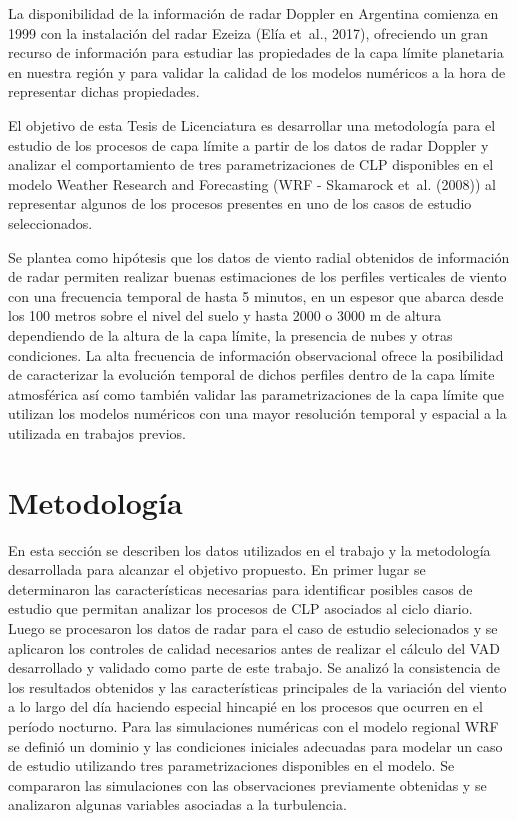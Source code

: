 \documentclass[12pt,spanish,oneside, a4paper]{book}
\begin{document}
La disponibilidad de la información de radar Doppler en Argentina
comienza en 1999 con la instalación del radar Ezeiza (Elía et~al.,
2017), ofreciendo un gran recurso de información para estudiar las
propiedades de la capa límite planetaria en nuestra región y para
validar la calidad de los modelos numéricos a la hora de representar
dichas propiedades.

El objetivo de esta Tesis de Licenciatura es desarrollar una metodología
para el estudio de los procesos de capa límite a partir de los datos de
radar Doppler y analizar el comportamiento de tres parametrizaciones de
CLP disponibles en el modelo Weather Research and Forecasting (WRF -
Skamarock et~al. (2008)) al representar algunos de los procesos
presentes en uno de los casos de estudio seleccionados.

Se plantea como hipótesis que los datos de viento radial obtenidos de
información de radar permiten realizar buenas estimaciones de los
perfiles verticales de viento con una frecuencia temporal de hasta 5
minutos, en un espesor que abarca desde los 100 metros sobre el nivel
del suelo y hasta 2000 o 3000 m de altura dependiendo de la altura de la
capa límite, la presencia de nubes y otras condiciones. La alta
frecuencia de información observacional ofrece la posibilidad de
caracterizar la evolución temporal de dichos perfiles dentro de la capa
límite atmosférica así como también validar las parametrizaciones de la
capa límite que utilizan los modelos numéricos con una mayor resolución
temporal y espacial a la utilizada en trabajos previos.

\chapter{Metodología}\label{metodologia}

En esta sección se describen los datos utilizados en el trabajo y la
metodología desarrollada para alcanzar el objetivo propuesto. En primer
lugar se determinaron las características necesarias para identificar
posibles casos de estudio que permitan analizar los procesos de CLP
asociados al ciclo diario. Luego se procesaron los datos de radar para
el caso de estudio selecionados y se aplicaron los controles de calidad
necesarios antes de realizar el cálculo del VAD desarrollado y validado
como parte de este trabajo. Se analizó la consistencia de los resultados
obtenidos y las características principales de la variación del viento a
lo largo del día haciendo especial hincapié en los procesos que ocurren
en el período nocturno. Para las simulaciones numéricas con el modelo
regional WRF se definió un dominio y las condiciones iniciales adecuadas
para modelar un caso de estudio utilizando tres parametrizaciones
disponibles en el modelo. Se compararon las simulaciones con las
observaciones previamente obtenidas y se analizaron algunas variables
asociadas a la turbulencia.
\end{document}

